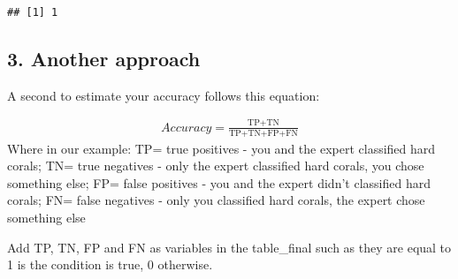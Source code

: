 \documentclass[]{article}
\newenvironment{Shaded}{\begin{snugshade}}{\end{snugshade}}
\newcommand{\KeywordTok}[1]{\textcolor[rgb]{0.13,0.29,0.53}{\textbf{#1}}}
\newcommand{\OperatorTok}[1]{\textcolor[rgb]{0.81,0.36,0.00}{\textbf{#1}}}
\newcommand{\NormalTok}[1]{#1}
\begin{document}
\begin{Shaded}
\end{Shaded}

\begin{verbatim}
## [1] 1
\end{verbatim}

\subsection{3. Another approach}\label{another-approach}

A second to estimate your accuracy follows this equation:

\[
\begin{aligned}
Accuracy=\frac{\text{TP+TN}}{\text{TP+TN+FP+FN}}
\end{aligned}
\] Where in our example: TP= true positives - you and the expert
classified hard corals; TN= true negatives - only the expert classified
hard corals, you chose something else; FP= false positives - you and the
expert didn't classified hard corals; FN= false negatives - only you
classified hard corals, the expert chose something else

Add TP, TN, FP and FN as variables in the table\_final such as they are
equal to 1 is the condition is true, 0 otherwise.
\end{document}
